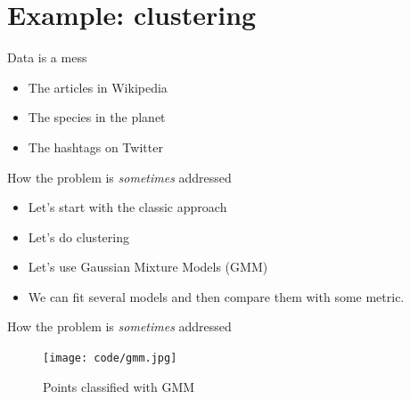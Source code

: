 \documentclass[handout]{beamer}
\begin{document}
\section{Example: clustering}
\begin{frame}{Data is a mess}
    \begin{itemize}
        \item The articles in Wikipedia
        \item The species in the planet
        \item The hashtags on Twitter
    \end{itemize}
\end{frame}

\begin{frame}{How the problem is \textit{sometimes} addressed}
    \begin{itemize}
        \item Let's start with the classic approach
        \item Let's do clustering
        \item Let's use Gaussian Mixture Models (GMM)
        \item We can fit several models and then compare them with some metric.
    \end{itemize}
\end{frame}

\begin{frame}{How the problem is \textit{sometimes} addressed}
    {\centering
    \begin{figure}[H]
        \centering
        \texttt{[image: code/gmm.jpg]}
        \caption{Points classified with GMM}
    \end{figure}
    }
\end{frame}
\end{document}

